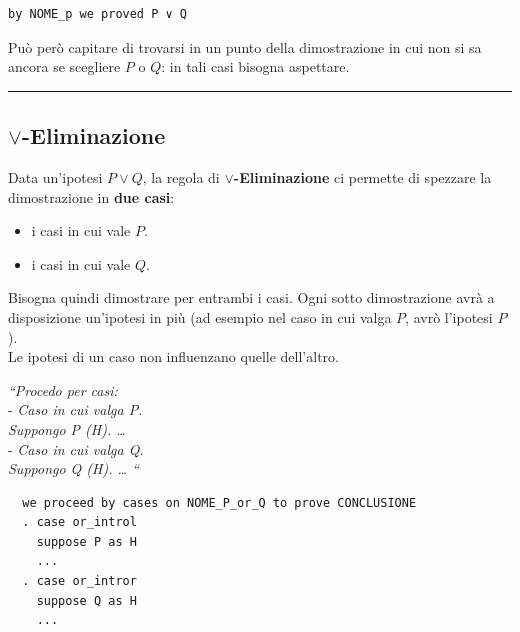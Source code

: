 \documentclass[
  a4paper,
]{article}
\providecommand{\tightlist}{%
  \setlength{\itemsep}{0pt}\setlength{\parskip}{0pt}}
\begin{document}
\begin{examplebox}

\begin{lstlisting}
by NOME_p we proved P ∨ Q
\end{lstlisting}

\end{examplebox}

Può però capitare di trovarsi in un punto della dimostrazione in cui non
si sa ancora se scegliere \(P\) o \(Q\): in tali casi bisogna aspettare.

\par\noindent\rule{\linewidth}{0.4pt}\par\vspace{6pt}

\hypertarget{lor-eliminazione}{%
\subsection{\texorpdfstring{\(\lor\)-Eliminazione}{\textbackslash lor-Eliminazione}}\label{lor-eliminazione}}

Data un'ipotesi \(P \lor Q\), la regola di
\textbf{\(\lor\)-Eliminazione} ci permette di spezzare la dimostrazione
in \textbf{due casi}:

\begin{itemize}
\tightlist
\item
  i casi in cui vale \(P\).\\
\item
  i casi in cui vale \(Q\).
\end{itemize}

Bisogna quindi dimostrare per entrambi i casi. Ogni sotto dimostrazione
avrà a disposizione un'ipotesi in più (ad esempio nel caso in cui valga
\(P\), avrò l'ipotesi \(P\)).\\
Le ipotesi di un caso non influenzano quelle dell'altro.

\begin{examplebox}[Esempio]

\emph{``Procedo per casi:}\\
- \emph{Caso in cui valga P.\\
Suppongo P (H). \ldots{}}\\
- \emph{Caso in cui valga Q.\\
Suppongo Q (H). \ldots{} ``}

\end{examplebox}

\begin{examplebox}

\begin{lstlisting}
  we proceed by cases on NOME_P_or_Q to prove CONCLUSIONE
  . case or_introl
    suppose P as H
    ...
  . case or_intror
    suppose Q as H
    ...
\end{lstlisting}

\end{examplebox}
\end{document}
